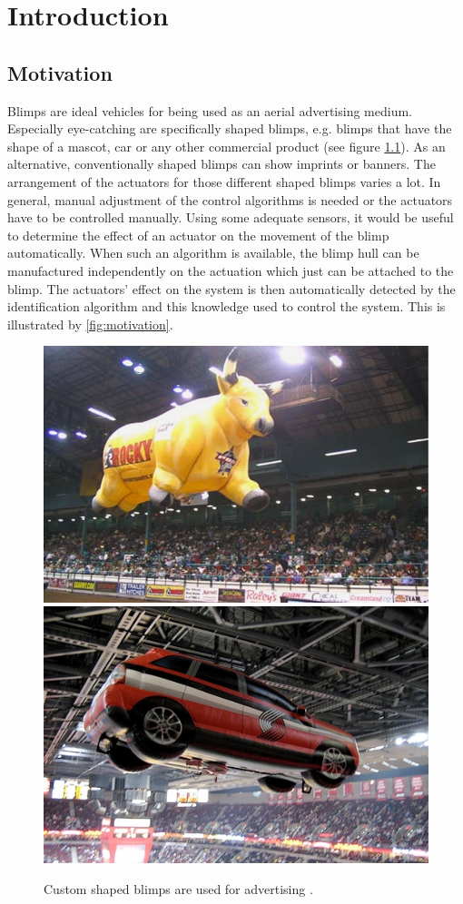 \chapter{Introduction}
\label{chap:introduction}

\section{Motivation}
Blimps are ideal vehicles for being used as an aerial advertising medium.
Especially eye-catching are specifically shaped blimps, e.g. blimps that have the shape of a mascot, car or any other commercial product (see figure \ref{fig:blimps}).
As an alternative, conventionally shaped blimps can show imprints or banners.
The arrangement of the actuators for those different shaped blimps varies a lot.
In general, manual adjustment of the control algorithms is needed or the actuators have to be controlled manually.
Using some adequate sensors, it would be useful to determine the effect of an actuator on the movement of the blimp automatically.
When such an algorithm is available, the blimp hull can be manufactured independently on the actuation which just can be attached to the blimp.
The actuators' effect on the system is then automatically detected by the identification algorithm and this knowledge used to control the system.
This is illustrated by \cref{fig:motivation}.

\begin{figure}[hbtp]
\centering
\includegraphics[width=.45\linewidth]{images/intro/CustomBull_Lg.jpg}
\includegraphics[width=.45\linewidth]{images/intro/CustomCar.jpg}
\caption{Custom shaped blimps are used for advertising \citep{rcblimps}.}
\label{fig:blimps}
\end{figure}

